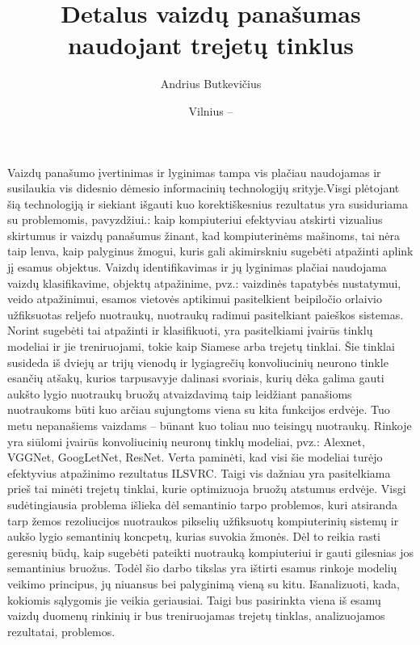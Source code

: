 \documentclass{VUMIFPSkursinis}
\title{Detalus vaizdų panašumas naudojant trejetų tinklus}
\author{Andrius Butkevičius}
\date{Vilnius – \the\year }
\begin{document}
\maketitle
\thispagestyle{empty} 

\tableofcontents



\thispagestyle{empty} 
Vaizdų panašumo įvertinimas ir lyginimas tampa vis plačiau naudojamas ir susilaukia vis didesnio dėmesio informacinių technologijų srityje.Visgi plėtojant šią technologiją ir siekiant išgauti kuo korektiškesnius rezultatus yra susiduriama su problemomis, pavyzdžiui.: kaip kompiuteriui efektyviau atskirti vizualius skirtumus ir vaizdų panašumus žinant, kad kompiuterinėms mašinoms, tai nėra taip lenva, kaip palyginus žmogui, kuris gali akimirskniu sugebėti atpažinti aplink jį esamus objektus. Vaizdų identifikavimas ir jų lyginimas plačiai naudojama vaizdų klasifikavime, objektų atpažinime, pvz.: vaizdinės tapatybės nustatymui, veido atpažinimui, esamos vietovės aptikimui pasitelkient beipiločio orlaivio užfiksuotas reljefo nuotraukų, nuotraukų radimui pasitelkiant paieškos sistemas. Norint sugebėti tai atpažinti ir klasifikuoti, yra pasitelkiami įvairūs tinklų modeliai ir jie treniruojami, tokie kaip Siamese arba trejetų tinklai. Šie tinklai susideda iš dviejų ar trijų vienodų ir lygiagrečių konvoliucinių neurono tinkle esančių atšakų, kurios tarpusavyje dalinasi svoriais, kurių dėka galima gauti aukšto lygio nuotraukų bruožų atvaizdavimą taip leidžiant panašioms nuotraukoms būti kuo arčiau sujungtoms viena su kita funkcijos erdvėje. Tuo metu nepanašiems vaizdams – būnant kuo toliau nuo teisingų nuotraukų. 
\newline	
Rinkoje yra siūlomi įvairūs konvoliucinių neuronų tinklų modeliai, pvz.: Alexnet, VGGNet, GoogLetNet, ResNet. Verta paminėti, kad visi šie modeliai turėjo efektyvius atpažinimo rezultatus ILSVRC. Taigi vis dažniau yra pasitelkiama prieš tai minėti trejetų tinklai, kurie optimizuoja bruožų atstumus erdvėje. Visgi sudėtingiausia problema išlieka dėl semantinio tarpo problemos, kuri atsiranda tarp žemos rezoliucijos nuotraukos pikselių užfiksuotų kompiuterinių sistemų ir aukšo lygio semantinių koncpetų, kurias suvokia žmonės. Dėl to reikia rasti geresnių būdų, kaip sugebėti pateikti nuotrauką kompiuteriui ir gauti gilesnias jos semantinius bruožus. 
\newline
Todėl šio darbo tikslas yra ištirti esamus rinkoje modelių veikimo principus, jų niuansus bei palyginimą vieną su kitu. Išanalizuoti, kada, kokiomis sąlygomis jie veikia geriausiai. Taigi bus pasirinkta viena iš esamų vaizdų duomenų rinkinių ir bus treniruojamas trejetų tinklas, analizuojamos rezultatai, problemos.
\end{document}
